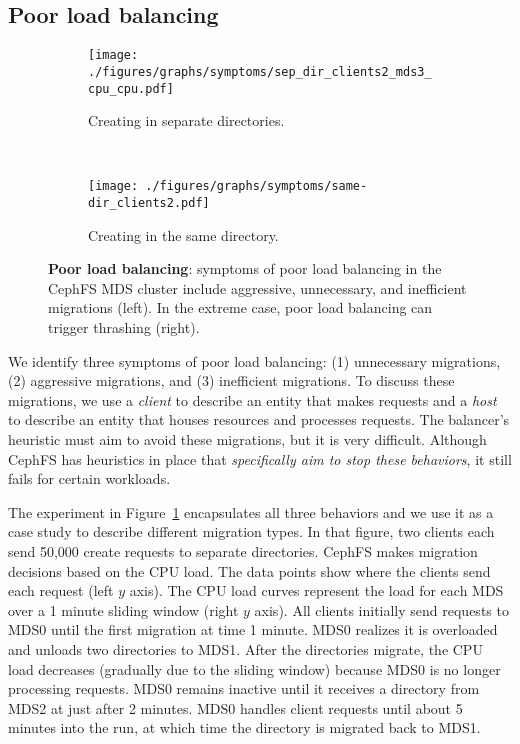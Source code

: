 \subsection{Poor load balancing}
\begin{figure*}[tbh]
	\begin{subfigure}[H]{0.5\textwidth}
	\centering
	\texttt{[image: ./figures/graphs/symptoms/sep\_dir\_clients2\_mds3\_cpu\_cpu.pdf]}
	\caption{Creating in separate directories.~\label{sep-dir_clients2_mds3_cpu_cpu}}
	\end{subfigure}
	~
	\begin{subfigure}[H]{0.5\textwidth}
	\centering	
	\texttt{[image: ./figures/graphs/symptoms/same-dir\_clients2.pdf]} 
	\caption{Creating in the same directory.~\label{thrashing}}
	\end{subfigure}	
	\caption{\textbf{Poor load balancing}: symptoms of poor load balancing in the CephFS MDS cluster include aggressive, unnecessary, and inefficient migrations (left). In the extreme case, poor load balancing can trigger thrashing (right).\label{load}}
\end{figure*}


We identify three symptoms of poor load balancing: (1) unnecessary migrations, (2) aggressive migrations, and (3) inefficient migrations. To discuss these migrations, we use a {\it client} to describe an entity that makes requests and a {\it host} to describe an entity that houses resources and processes requests. The balancer's heuristic must aim to avoid these migrations, but it is very difficult. Although CephFS has heuristics in place that {\it specifically aim to stop these behaviors}, it still fails for certain workloads.

The experiment in Figure~\ref{sep-dir_clients2_mds3_cpu_cpu} encapsulates all three behaviors and we use it as a case study to describe different migration types. In that figure, two clients each send 50,000 create requests to separate directories. CephFS makes migration decisions based on the CPU load. The data points show where the clients send each request (left \(y\) axis). The CPU load curves represent the load for each MDS over a 1 minute sliding window (right \(y\) axis). All clients initially send requests to MDS0 until the first migration at time 1 minute. MDS0 realizes it is overloaded and unloads two directories to MDS1. After the directories migrate, the CPU load decreases (gradually due to the sliding window) because MDS0 is no longer processing requests. MDS0 remains inactive until it receives a directory from MDS2 at just after 2 minutes. MDS0 handles client requests until about 5 minutes into the run, at which time the directory is migrated back to MDS1. 

